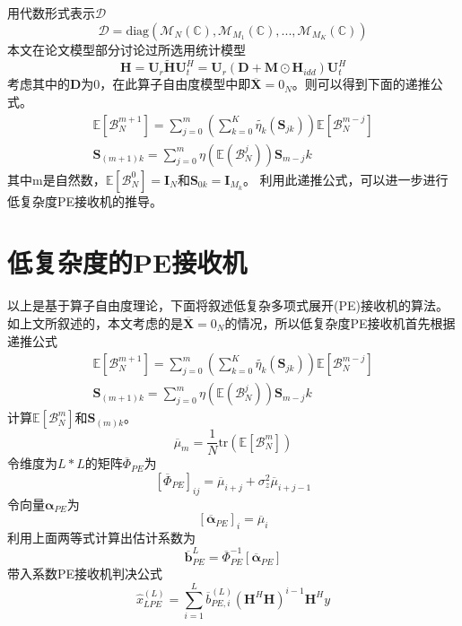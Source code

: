 \documentclass[bachelor,nocolorlinks, printoneside]{seuthesis} %
\begin{document}
\begin{Main}
用代数形式表示$\mathcal{D}$
\begin{equation}\label{key}
\mathcal{D} = \mathrm{diag}(\mathcal{M}_N(\mathbb{C}),\mathcal{M}_{M_1}(\mathbb{C}),...,\mathcal{M}_{M_K}(\mathbb{C}))
\end{equation}
本文在论文模型部分讨论过所选用统计模型
\begin{equation}\label{key}
\mathbf{H} = \mathbf{U}_{r}\tilde{\mathbf{H}}\mathbf{U}_{t}^{H} = \mathbf{U}_{r}(\mathbf{D}+\mathbf{M}\odot \mathbf{H}_{idd})\mathbf{U}_{t}^{H}
\end{equation}
考虑其中的$\mathbf{D}$为0，在此算子自由度模型中即$\overline{\mathbf{X}} = 0_N$。则可以得到下面的递推公式。
\begin{gather}\label{key}
\mathbb{E}[\mathcal{B}^{m+1}_N] = \sum_{j=0}^{m}(\sum_{k=0}^{K}\tilde{\eta_k}(\mathbf{S}_{jk}))\mathbb{E}[\mathcal{B}_N^{m-j}] \\
\mathbf{S}_{(m+1)k} =\sum_{j=0}^{m}\eta(\mathbb{E}(\mathcal{B}_N^j))\mathbf{S}_{m-j}k
\end{gather}
其中m是自然数，$\mathbb{E}[\mathcal{B}_N^0]=\mathbf{I}_N$和$\mathbf{S}_{0k}=\mathbf{I}_{M_k}$。
利用此递推公式，可以进一步进行低复杂度PE接收机的推导。

\section{低复杂度的PE接收机}
以上是基于算子自由度理论，下面将叙述低复杂多项式展开(PE)接收机的算法。如上文所叙述的，本文考虑的是$\overline{\mathbf{X}} = 0_N$的情况，所以低复杂度PE接收机首先根据递推公式
\begin{gather}\label{key}
\mathbb{E}[\mathcal{B}^{m+1}_N] = \sum_{j=0}^{m}(\sum_{k=0}^{K}\tilde{\eta_k}(\mathbf{S}_{jk}))\mathbb{E}[\mathcal{B}_N^{m-j}] \\
\mathbf{S}_{(m+1)k} =\sum_{j=0}^{m}\eta(\mathbb{E}(\mathcal{B}_N^j))\mathbf{S}_{m-j}k
\end{gather}
计算$\mathbb{E}[\mathcal{B}_N^{m}]$和$\mathbf{S}_{(m)k}$。
\begin{equation}\label{key}
\overline{\mu}_{m} = \frac{1}{N} \mathrm{tr}(\mathbb{E}[\mathcal{B}_N^{m}])
\end{equation}
令维度为$L*L$的矩阵$\overline{\Phi}_{PE}$为
\begin{equation}\label{key}
[\overline{\Phi}_{PE}]_{ij} = \overline{\mu}_{i+j} + \sigma_z^2 \overline{\mu}_{i+j-1}
\end{equation}
令向量$\bm{\alpha}_{PE}$为
\begin{equation}\label{key}
[\overline{\bm{\alpha}}_{PE}]_i = \overline{\mu}_i
\end{equation}
利用上面两等式计算出估计系数为
\begin{equation}\label{key}
\overline{\mathbf{b}}_{PE}^{L} = \overline{\Phi}_{PE}^{-1} [\overline{\bm{\alpha}}_{PE}]
\end{equation}
带入系数PE接收机判决公式
\begin{equation}\label{key}
\hat{x}_{LPE}^{(L)} = \sum_{i=1}^{L}\overline{b}_{PE,i}^{(L)}(\mathbf{H}^H\mathbf{H})^{i-1}  \mathbf{H}^H y
\end{equation}


\end{Main}
\end{document}
